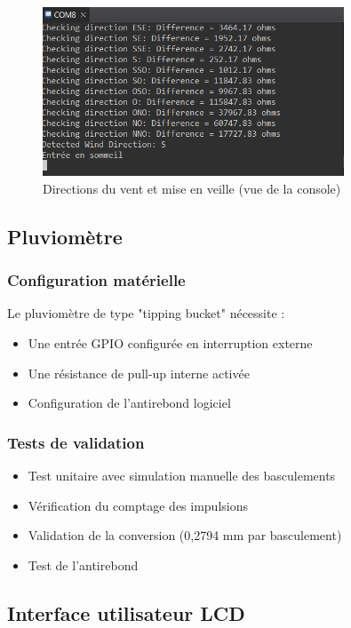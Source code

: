 \documentclass[12pt]{article}
\begin{document}
\begin{figure}[H]
    \capstart
    \centering
    \includegraphics[width=0.8\textwidth]{./images/console_direction_du_vent_et_miseenveille.png}
    \caption{Directions du vent et mise en veille (vue de la console)} 
    \label{fig:girouette_positions}
\end{figure}

\subsection{Pluviomètre}
\subsubsection{Configuration matérielle}
Le pluviomètre de type "tipping bucket" nécessite :
\begin{itemize}
    \item Une entrée GPIO configurée en interruption externe
    \item Une résistance de pull-up interne activée
    \item Configuration de l'antirebond logiciel
\end{itemize}

\subsubsection{Tests de validation}
\begin{itemize}
    \item Test unitaire avec simulation manuelle des basculements
    \item Vérification du comptage des impulsions
    \item Validation de la conversion (0,2794 mm par basculement)
    \item Test de l'antirebond
\end{itemize}

\subsection{Interface utilisateur LCD}
\end{document}
